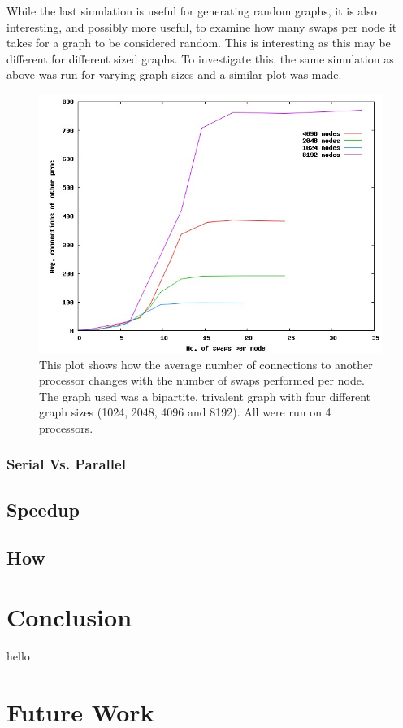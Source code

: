 \documentclass[pdftex,12pt,a4paper]{article}
\begin{document}
While the last simulation is useful for generating random graphs, it is also interesting, and possibly more useful, to examine how many swaps per node it takes for a graph to be considered random. This is interesting as this may be different for different sized graphs. To investigate this, the same simulation as above was run for varying graph sizes and a similar plot was made.

\begin{figure}
\centering
\includegraphics[scale=0.6]{swaps_per_node.jpg}
\caption{This plot shows how the average number of connections to another processor changes with the number of swaps performed per node. The graph used was a bipartite, trivalent graph with four different graph sizes (1024, 2048, 4096 and 8192). All were run on 4 processors.}
\end{figure}

\subsubsection{Serial Vs. Parallel}

\subsection{Speedup}

\subsection{How}

\newpage

\section{Conclusion}

hello

\newpage

\section{Future Work}
\end{document}
